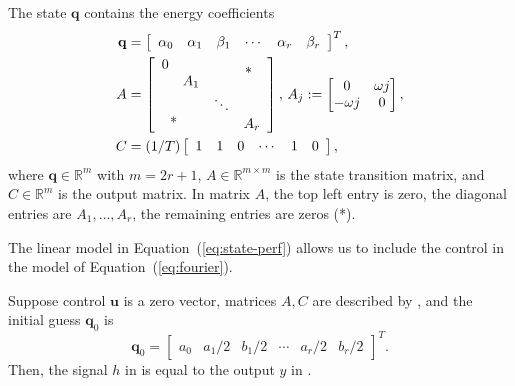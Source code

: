 The state $\mathbf{q}$ contains the energy coefficients
\begin{equation}\label{eq:state-details}\begin{split}
  \mathbf{q}&=\left[\begin{array}{cccccc}
    \alpha_0 & \alpha_1 & \beta_1 & \cdots & \alpha_r & \beta_r
  \end{array}\right]^T,\\
  A&=\left[\begin{array}{cccc}
    0&                     &       & \makebox(-5,-5){*}  \\
     & A_1                 &       &  \\
     & \makebox(-25,-15){*}& \ddots&  \\
     &                     &       & A_r 
  \end{array}\right],\,A_j:=\begin{bmatrix}0 & \omega j \\ -\omega j & 0\end{bmatrix},\\
  C&=(1/T)\left[\begin{array}{cccccc}
    1 & 1 & 0 &\cdots & 1 & 0
  \end{array}\right],
\end{split}\end{equation}
where $\mathbf{q}\in\mathbb{R}^m$ with $m=2r+1$, $A\in\mathbb{R}^{m\times m}$ is the state transition matrix, and $C\in\mathbb{R}^m$ is the output matrix. In matrix $A$, the top left entry is zero, the diagonal entries are $A_1,\dots,A_r$, the remaining entries are zeros (*).

The linear model in Equation~(\ref{eq:state-perf}) allows us to include the control in the model of Equation~(\ref{eq:fourier}).

\begin{highlight}
\begin{lem}\label{lem:eqv}Suppose control $\mathbf{u}$ is a zero vector, matrices $A,C$ are described by , and the initial guess $\mathbf{q}_0$ is 
  \begin{equation*}
  \mathbf{q}_0=\begin{bmatrix}a_0 & a_1/2 & b_1/2 & \cdots & a_r/2 & b_r/2\end{bmatrix}^T.
  \end{equation*} 
  Then, the signal $h$ in  is equal to the output $y$ in .
\end{lem}
\end{highlight}

